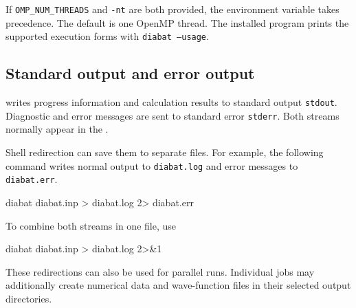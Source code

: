 If \texttt{OMP\_NUM\_THREADS} and \texttt{-nt} are both provided, the environment variable takes precedence. The default is one OpenMP thread. The installed program prints the supported execution forms with \texttt{diabat --usage}.

\subsection{Standard output and error output}\label{sec-stdout}
\progname{} writes progress information and calculation results to standard output \texttt{stdout}. Diagnostic and error messages are sent to standard error \texttt{stderr}. Both streams normally appear in the .

Shell redirection can save them to separate files. For example, the following command writes normal output to \texttt{diabat.log} and error messages to \texttt{diabat.err}.
\begin{lst-installation}
diabat diabat.inp > diabat.log 2> diabat.err
\end{lst-installation}
To combine both streams in one file, use
\begin{lst-installation}
diabat diabat.inp > diabat.log 2>&1
\end{lst-installation}
These redirections can also be used for parallel runs.
Individual jobs may additionally create numerical data and wave-function files in their selected output directories.
